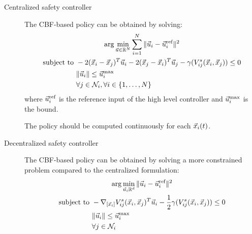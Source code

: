 \begin{description}
    \item[Centralized safety controller] 
        The CBF-based policy can be obtained by solving:
        \[
            \begin{gathered}
                \arg\min_{{\vec{u}} \in \mathbb{R}^N} \sum_{i=1}^{N} \Vert {\vec{u}}_i - {\vec{u}}_i^\text{ref} \Vert^2 \\
                \begin{aligned}
                    \text{subject to } 
                    &-2({\vec{x}}_i-{\vec{x}}_j)^T {\vec{u}}_i - 2({\vec{x}}_j-{\vec{x}}_i)^T {\vec{u}}_j - \gamma(V_{ij}^s({\vec{x}}_i, {\vec{x}}_j)) \leq 0 \\
                    & \Vert {\vec{u}}_i \Vert \leq {\vec{u}}_i^\text{max} \\
                    & \forall j \in \mathcal{N}_i, \forall i \in \{ 1, \dots, N \}
                \end{aligned}
            \end{gathered}
        \]
        where ${\vec{u}}_i^\text{ref}$ is the reference input of the high level controller and ${\vec{u}}_i^\text{max}$ is the bound.

        \begin{remark}
            The policy should be computed continuously for each ${\vec{x}}_i(t)$.
        \end{remark}

    \item[Decentralized safety controller] 
        The CBF-based policy can be obtained by solving a more constrained problem compared to the centralized formulation:
        \[
            \begin{gathered}
                \arg\min_{{\vec{u}}_i \mathbb{R}^d} \Vert {\vec{u}}_i - {\vec{u}}_i^\text{ref} \Vert^2 \\
                \begin{aligned}
                    \text{subject to } &- \nabla_{[{\vec{x}}_i]} V_{ij}^s({\vec{x}}_i, {\vec{x}}_j)^T {\vec{u}}_i - \frac{1}{2} \gamma (V_{ij}^s({\vec{x}}_i, {\vec{x}}_j)) \leq 0 \\
                    & \Vert {\vec{u}}_i \Vert \leq {\vec{u}}_i^\text{max} \\
                    & \forall j \in \mathcal{N}_i
                \end{aligned}
            \end{gathered}
        \]


\end{description}
